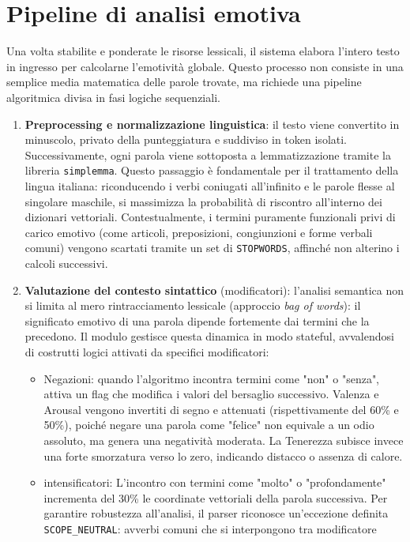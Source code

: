 \section{Pipeline di analisi emotiva}
Una volta stabilite e ponderate le risorse lessicali, il sistema elabora l'intero testo in ingresso per calcolarne l'emotività globale. 
Questo processo non consiste in una semplice media matematica delle parole trovate, ma richiede una pipeline algoritmica divisa in fasi logiche sequenziali.
\begin{enumerate}
    \item \textbf{Preprocessing e normalizzazione linguistica}: il testo viene convertito in minuscolo, privato della punteggiatura e suddiviso in 
    token isolati. Successivamente, ogni parola viene sottoposta a lemmatizzazione tramite la libreria \texttt{simplemma}. Questo passaggio è fondamentale 
    per il trattamento della lingua italiana: riconducendo i verbi coniugati all'infinito e le parole flesse al singolare maschile, si massimizza 
    la probabilità di riscontro all'interno dei dizionari vettoriali. Contestualmente, i termini puramente funzionali privi di carico emotivo 
    (come articoli, preposizioni, congiunzioni e forme verbali comuni) vengono scartati tramite un set di \texttt{STOPWORDS}, affinché non alterino i 
    calcoli successivi.
    \item \textbf{Valutazione del contesto sintattico} (modificatori): l'analisi semantica non si limita al mero rintracciamento lessicale (approccio \textit{bag of words}): 
    il significato emotivo di una parola dipende fortemente dai termini che la precedono. Il modulo gestisce questa dinamica in modo stateful, 
    avvalendosi di costrutti logici attivati da specifici modificatori:
    \begin{itemize}
        \item Negazioni: quando l'algoritmo incontra termini come "non" o "senza", attiva un flag che modifica i valori del bersaglio successivo. 
        Valenza e Arousal vengono invertiti di segno e attenuati (rispettivamente del 60\% e 50\%), poiché negare una parola come "felice" non equivale a
        un odio assoluto, ma genera una negatività moderata. La Tenerezza subisce invece una forte smorzatura verso lo zero, indicando distacco o assenza di 
        calore.
        \item intensificatori: L'incontro con termini come "molto" o "profondamente" incrementa del 30\% le coordinate vettoriali della parola successiva. 
        Per garantire robustezza all'analisi, il parser riconosce un'eccezione definita \texttt{SCOPE\_NEUTRAL}: avverbi comuni che si interpongono tra modificatore 

\end{itemize}
\end{enumerate}
